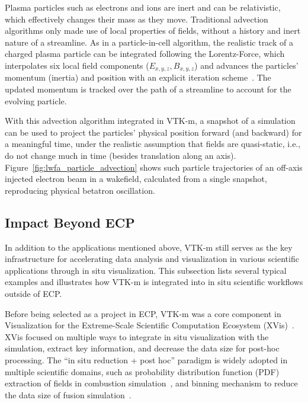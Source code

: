 Plasma particles such as electrons and ions are inert and can be relativistic, which effectively changes their mass as they move.
Traditional advection algorithms only made use of local properties of fields, without a history and inert nature of a streamline.
As in a particle-in-cell algorithm, the realistic track of a charged plasma particle can be integrated following the Lorentz-Force, which interpolates six local field components ($E_{x,y,z}, B_{x,y,z}$) and advances the particles' momentum (inertia) and position with an explicit iteration scheme~\cite{Boris1970}.
The updated momentum is tracked over the path of a streamline to account for the evolving particle.

With this advection algorithm integrated in VTK-m, a snapshot of a simulation can be used to project the particles' physical position forward (and backward) for a meaningful time, under the realistic assumption that fields are quasi-static, i.e., do not change much in time (besides translation along an axis).
Figure~\ref{fig:lwfa_particle_advection} shows such particle trajectories of an off-axis injected electron beam in a wakefield, calculated from a single snapshot, reproducing physical betatron oscillation.

\subsection{Impact Beyond ECP}


In addition to the applications mentioned above, VTK-m still serves as the key infrastructure for accelerating data analysis and visualization in various scientific applications through in situ visualization. This subsection lists several typical examples and illustrates how VTK-m is integrated into in situ scientific workflows outside of ECP.


Before being selected as a project in ECP, VTK-m was a core component in Visualization for the Extreme-Scale Scientific Computation Ecosystem (XVis)~\cite{Moreland2019}. 
XVis focused on multiple ways to integrate in situ visualization with the simulation, extract key information, and decrease the data size for post-hoc processing.
The ``in situ reduction + post hoc'' paradigm is widely adopted in multiple scientific domains, such as probability distribution function (PDF) extraction of fields in combustion simulation~\cite{Ye2016}, and binning mechanism to reduce the data size of fusion simulation~\cite{Kress2018}. 


